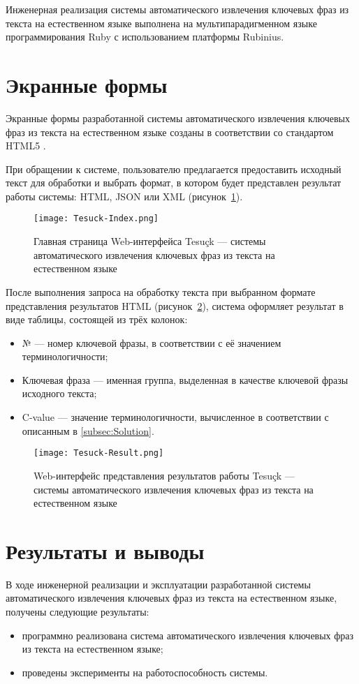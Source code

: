 Инженерная реализация системы автоматического извлечения ключевых фраз
из текста на естественном языке выполнена на мультипарадигменном
языке программирования Ruby с использованием платформы Rubinius.

\section{Экранные формы}
Экранные формы разработанной системы автоматического извлечения
ключевых фраз из текста на естественном языке созданы в соответствии
со стандартом HTML5 \cite{HTML5}.

При обращении к системе, пользователю предлагается предоставить
исходный текст для обработки и выбрать формат, в котором будет
представлен результат работы системы: HTML, JSON или XML
(рисунок~\ref{fig:Implementation:Index}).

\begin{figure}[ht]
  \centering
  \texttt{[image: Tesuck-Index.png]}
  \caption{Главная страница Web-интерфейса Tesuçk — системы
автоматического извлечения ключевых фраз из текста на
естественном языке}
  \label{fig:Implementation:Index}
\end{figure}

После выполнения запроса на обработку текста при выбранном формате
представления результатов HTML
(рисунок~\ref{fig:Implementation:Result}), система оформляет
результат в виде таблицы, состоящей из трёх колонок:
\begin{itemize}
  \item № — номер ключевой фразы, в соответствии с её значением
терминологичности;
  \item Ключевая фраза — именная группа, выделенная в качестве
ключевой фразы исходного текста;
  \item C-value — значение терминологичности, вычисленное в
соответствии с описанным в \ref{subsec:Solution}.
\end{itemize}

\begin{figure}[ht]
  \centering
  \texttt{[image: Tesuck-Result.png]}
  \caption{Web-интерфейс представления результатов работы Tesuçk —
системы автоматического извлечения ключевых фраз из текста на
естественном языке}
  \label{fig:Implementation:Result}
\end{figure}

\section{Результаты и выводы}
В ходе инженерной реализации и эксплуатации разработанной системы
автоматического извлечения ключевых фраз из текста на
естественном языке, получены следующие результаты:
\begin{itemize}
  \item программно реализована система автоматического
извлечения ключевых фраз из текста на естественном языке;
  \item проведены эксперименты на работоспособность системы.
\end{itemize}
